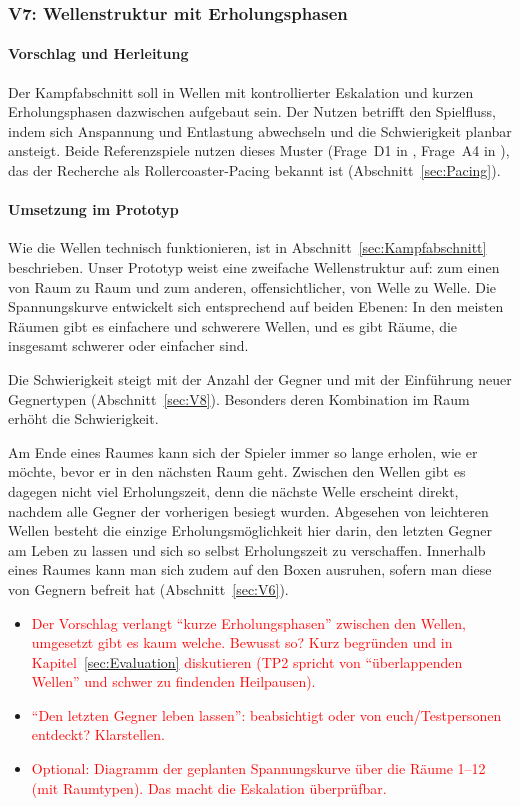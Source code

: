 \documentclass[../Main.tex]{subfiles}
\begin{document}
\subsubsection{V7: Wellenstruktur mit Erholungsphasen} \label{sec:V7}

\paragraph{Vorschlag und Herleitung}
Der Kampfabschnitt soll in Wellen mit kontrollierter Eskalation und kurzen Erholungsphasen dazwischen aufgebaut sein. Der Nutzen betrifft den Spielfluss, indem sich Anspannung und Entlastung abwechseln und die Schwierigkeit planbar ansteigt. Beide Referenzspiele nutzen dieses Muster (Frage~D1 in , Frage~A4 in ), das der Recherche als Rollercoaster-Pacing bekannt ist (Abschnitt~\ref{sec:Pacing}).

\paragraph{Umsetzung im Prototyp}
Wie die Wellen technisch funktionieren, ist in Abschnitt~\ref{sec:Kampfabschnitt} beschrieben. Unser Prototyp weist eine zweifache Wellenstruktur auf: zum einen von Raum zu Raum und zum anderen, offensichtlicher, von Welle zu Welle. Die Spannungskurve entwickelt sich entsprechend auf beiden Ebenen: In den meisten Räumen gibt es einfachere und schwerere Wellen, und es gibt Räume, die insgesamt schwerer oder einfacher sind.

Die Schwierigkeit steigt mit der Anzahl der Gegner und mit der Einführung neuer Gegnertypen (Abschnitt~\ref{sec:V8}). Besonders deren Kombination im Raum erhöht die Schwierigkeit.

Am Ende eines Raumes kann sich der Spieler immer so lange erholen, wie er möchte, bevor er in den nächsten Raum geht. Zwischen den Wellen gibt es dagegen nicht viel Erholungszeit, denn die nächste Welle erscheint direkt, nachdem alle Gegner der vorherigen besiegt wurden. Abgesehen von leichteren Wellen besteht die einzige Erholungsmöglichkeit hier darin, den letzten Gegner am Leben zu lassen und sich so selbst Erholungszeit zu verschaffen. Innerhalb eines Raumes kann man sich zudem auf den Boxen ausruhen, sofern man diese von Gegnern befreit hat (Abschnitt~\ref{sec:V6}).

\begin{itemize}[leftmargin=1.5cm]
    \item \textcolor{red}{Der Vorschlag verlangt \enquote{kurze Erholungsphasen} zwischen den Wellen, umgesetzt gibt es kaum welche. Bewusst so? Kurz begründen und in Kapitel~\ref{sec:Evaluation} diskutieren (TP2 spricht von \enquote{überlappenden Wellen} und schwer zu findenden Heilpausen).}
    \item \textcolor{red}{\enquote{Den letzten Gegner leben lassen}: beabsichtigt oder von euch/Testpersonen entdeckt? Klarstellen.}
    \item \textcolor{red}{Optional: Diagramm der geplanten Spannungskurve über die Räume 1--12 (mit Raumtypen). Das macht die Eskalation überprüfbar.}
\end{itemize}
\end{document}
